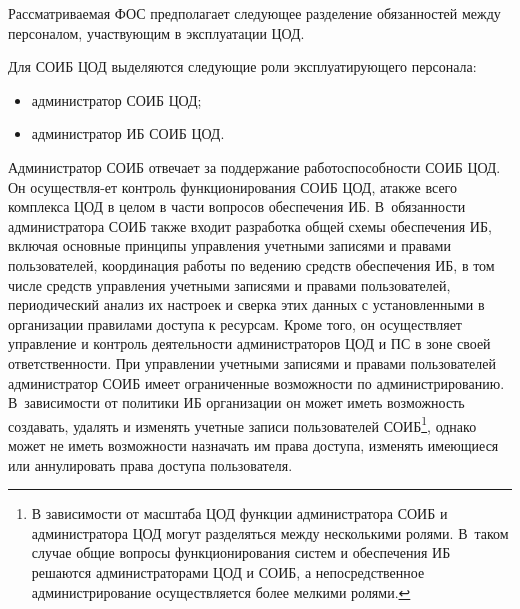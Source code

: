 \begin{multicols}{2}
       Рассматриваемая ФОС предполагает следующее разделение обязанностей между 
персоналом, участвующим в эксплуатации ЦОД.
       
       Для СОИБ ЦОД выделяются следующие роли эксплуатирующего персонала:
       \begin{itemize}
\item администратор СОИБ ЦОД;
\item администратор ИБ СОИБ ЦОД.
\end{itemize}

       Администратор СОИБ отвечает за поддержание работоспособности СОИБ ЦОД. 
Он осуществля-\linebreak ет контроль функционирования СОИБ ЦОД, а\linebreak также всего комплекса ЦОД 
в целом в части вопросов обеспечения ИБ. В~обязанности администратора СОИБ также 
входит разработка общей схемы обеспечения ИБ, включая основные принципы 
управления учетными записями и правами пользователей, координация работы по 
ведению средств обеспечения ИБ, в том числе средств управления учетными записями и 
правами пользователей, периодический анализ их настроек и сверка этих данных с 
уста\-нов\-лен\-ны\-ми в организации правилами доступа к ресурсам. Кроме того, он 
осуществляет управ\-ле\-ние и контроль деятельности администраторов ЦОД и ПС в зоне 
своей ответственности. При управлении учетными записями и правами пользователей 
администратор СОИБ
имеет ограниченные возможности по администрированию. В~зависи\-мости от политики 
ИБ организации он может иметь возможность создавать, удалять и изменять учетные записи 
пользователей СОИБ\footnote{В зависимости от масштаба ЦОД функции администратора 
СОИБ и администратора ЦОД могут разделяться между несколькими ролями. В~таком случае 
общие вопросы функционирования сис\-тем и обеспечения ИБ решаются администраторами ЦОД и 
СОИБ, а непосредственное администрирование осуществляется более мелкими ролями.}, однако 
может не иметь возможности назначать им права доступа, изменять имеющиеся или 
аннулировать права доступа пользователя.
       

\end{multicols}
